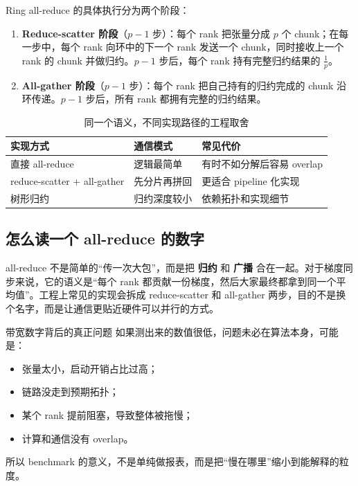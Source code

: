 \documentclass[a4paper]{article}
\begin{document}
Ring all-reduce 的具体执行分为两个阶段：

\begin{enumerate}
    \item \textbf{Reduce-scatter 阶段}（$p-1$ 步）：每个 rank 把张量分成 $p$ 个 chunk；在每一步中，每个 rank 向环中的下一个 rank 发送一个 chunk，同时接收上一个 rank 的 chunk 并做归约。$p-1$ 步后，每个 rank 持有完整归约结果的 $\frac{1}{p}$。
    \item \textbf{All-gather 阶段}（$p-1$ 步）：每个 rank 把自己持有的归约完成的 chunk 沿环传递。$p-1$ 步后，所有 rank 都拥有完整的归约结果。
\end{enumerate}

\begin{table}[H]
\centering
\small
\begin{tabular}{p{3cm}p{4cm}p{4.2cm}}
\toprule
\textbf{实现方式} & \textbf{通信模式} & \textbf{常见代价} \\
\midrule
直接 all-reduce & 逻辑最简单 & 有时不如分解后容易 overlap \\
reduce-scatter + all-gather & 先分片再拼回 & 更适合 pipeline 化实现 \\
树形归约 & 归约深度较小 & 依赖拓扑和实现细节 \\
\bottomrule
\end{tabular}
\caption{同一个语义，不同实现路径的工程取舍}
\end{table}

\subsection{怎么读一个 all-reduce 的数字}

all-reduce 不是简单的“传一次大包”，而是把 \textbf{归约} 和 \textbf{广播} 合在一起。对于梯度同步来说，它的语义是“每个 rank 都贡献一份梯度，然后大家最终都拿到同一个平均值”。工程上常见的实现会拆成 reduce-scatter 和 all-gather 两步，目的不是换个名字，而是让通信更贴近硬件可以并行的方式。

\begin{importantbox}{带宽数字背后的真正问题}
如果测出来的数值很低，问题未必在算法本身，可能是：
\begin{itemize}
    \item 张量太小，启动开销占比过高；
    \item 链路没走到预期拓扑；
    \item 某个 rank 提前阻塞，导致整体被拖慢；
    \item 计算和通信没有 overlap。
\end{itemize}
所以 benchmark 的意义，不是单纯做报表，而是把“慢在哪里”缩小到能解释的粒度。
\end{importantbox}
\end{document}
